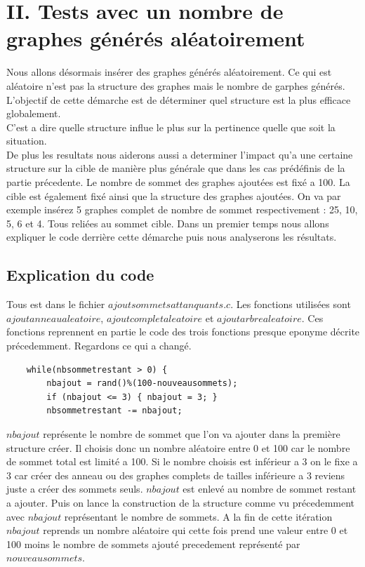 \documentclass[a4paper,11pt]{article}
\begin{document}
\section{II.	Tests avec un nombre de graphes générés aléatoirement}
	Nous allons désormais insérer des graphes générés aléatoirement. Ce qui est aléatoire n'est pas la structure des graphes mais le nombre de garphes générés.\\
	L'objectif de cette démarche est de déterminer quel structure est la plus efficace globalement.\\
	C'est a dire quelle structure influe le plus sur la pertinence quelle que soit la situation.\\
	De plus les resultats nous aiderons aussi a determiner l'impact qu'a une certaine structure sur la cible de manière plus générale 
	que dans les cas prédéfinis de la partie précedente.
	Le nombre de sommet des graphes ajoutées est fixé a 100.
	La cible est également fixé ainsi que la structure des graphes ajoutées.
	On va par exemple insérez 5 graphes complet de nombre de sommet respectivement : 25, 10, 5, 6 et 4. Tous reliées au sommet cible.
	Dans un premier temps nous allons expliquer le code derrière cette démarche puis nous analyserons les résultats.

	\subsection{Explication du code}
		Tous est dans le fichier $ajoutsommetsattanquants.c$. Les fonctions utilisées sont $ajoutanneaualeatoire$, $ajoutcompletaleatoire$
		et $ajoutarbrealeatoire$. Ces fonctions reprennent en partie le code des trois fonctions presque eponyme décrite précedemment.
		Regardons ce qui a changé. 
		\begin{lstlisting}
	while(nbsommetrestant > 0) {
		nbajout = rand()%(100-nouveausommets);
		if (nbajout <= 3) { nbajout = 3; }
		nbsommetrestant -= nbajout;
		\end{lstlisting}
		$nbajout$ représente le nombre de sommet que l'on va ajouter dans la première structure créer. Il choisis donc un nombre 
		aléatoire entre 0 et 100 car le nombre de sommet total est limité a 100. Si le nombre choisis est inférieur a 3 on le fixe a 3 car créer
		des anneau ou des graphes complets de tailles inférieure a 3 reviens juste a créer des sommets seuls.
		$nbajout$ est enlevé au nombre de sommet restant a ajouter. Puis on lance la construction de la structure comme vu précedemment 
		avec $nbajout$ représentant le nombre de sommets. A la fin de cette itération $nbajout$ reprends un nombre aléatoire qui cette fois
		prend une valeur entre 0 et 100 moins le nombre de sommets ajouté precedement représenté par $nouveausommets$.
\end{document}
